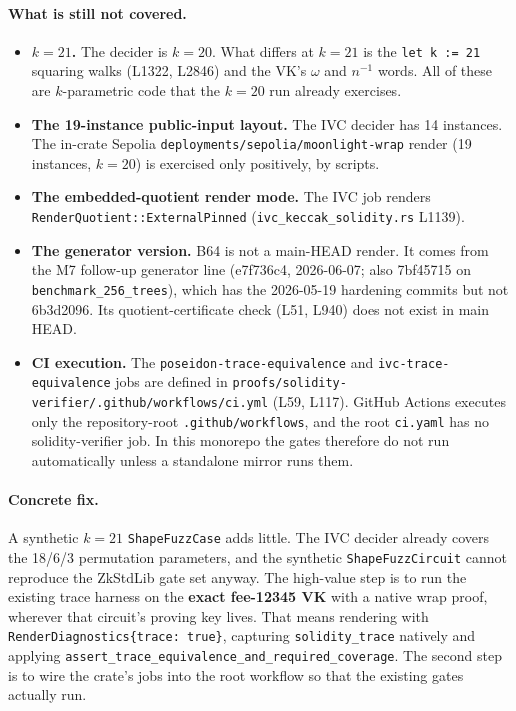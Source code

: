 \paragraph{What is still not covered.}
\begin{itemize}[leftmargin=1.4em,itemsep=2pt]
\item \textbf{$k=21$.} The decider is $k=20$. What differs at
  $k=21$ is the \texttt{let k := 21} squaring walks (L1322,
  L2846) and the VK's $\omega$ and $n^{-1}$ words. All of these are
  $k$-parametric code that the $k=20$ run already exercises.
\item \textbf{The 19-instance public-input layout.} The IVC
  decider has 14 instances. The in-crate Sepolia
  \texttt{deployments/\allowbreak{}sepolia/\allowbreak{}moonlight-wrap} render (19
  instances, $k=20$) is exercised only positively, by scripts.
\item \textbf{The embedded-quotient render mode.} The IVC job
  renders \texttt{RenderQuotient::ExternalPinned}
  (\texttt{ivc\_\allowbreak{}keccak\_\allowbreak{}solidity.rs} L1139).
\item \textbf{The generator version.} B64 is not a main-HEAD
  render. It comes from the M7 follow-up generator line (e7f736c4,
  2026-06-07; also 7bf45715 on \texttt{benchmark\_\allowbreak{}256\_\allowbreak{}trees}),
  which has the 2026-05-19 hardening commits but not 6b3d2096.
  Its quotient-certificate check (L51, L940) does not exist in main
  HEAD.
\item \textbf{CI execution.} The \texttt{poseidon-trace-equivalence}
  and \texttt{ivc-trace-equivalence} jobs are defined in
  \texttt{proofs/\allowbreak{}solidity-verifier/\allowbreak{}.github/\allowbreak{}workflows/\allowbreak{}ci.yml}
  (L59, L117). GitHub Actions executes only the repository-root
  \texttt{.github/workflows}, and the root \texttt{ci.yaml} has no
  solidity-verifier job. In this monorepo the gates therefore do not
  run automatically unless a standalone mirror runs them.
\end{itemize}

\paragraph{Concrete fix.}
A synthetic $k=21$ \texttt{ShapeFuzzCase} adds little. The IVC
decider already covers the 18/6/3 permutation parameters, and the
synthetic \texttt{ShapeFuzzCircuit} cannot reproduce the ZkStdLib
gate set anyway. The high-value step is to run the existing trace
harness on the \textbf{exact fee-12345 VK} with a native wrap proof,
wherever that circuit's proving key lives. That means rendering with
\texttt{RenderDiagnostics\{trace: true\}}, capturing
\texttt{solidity\_trace} natively and applying
\texttt{assert\_\allowbreak{}trace\_\allowbreak{}equivalence\_\allowbreak{}and\_\allowbreak{}required\_\allowbreak{}coverage}. The
second step is to wire the crate's jobs into the root workflow so
that the existing gates actually run.

